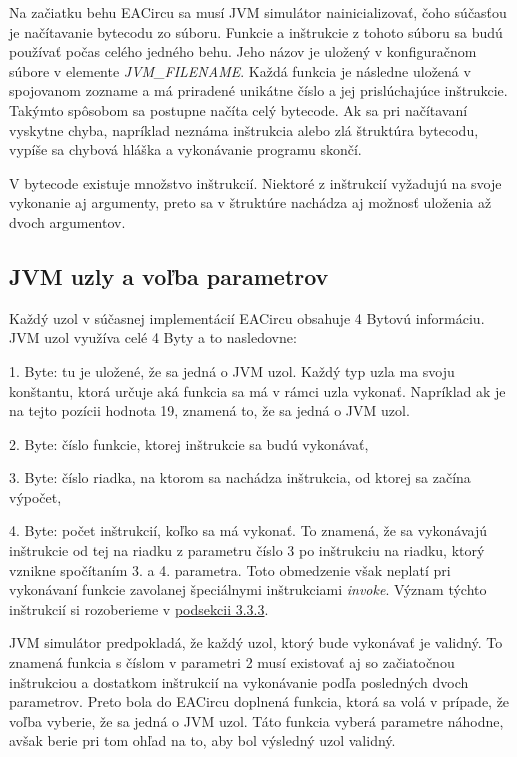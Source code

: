 Na začiatku behu EACircu sa musí JVM simulátor nainicializovať, čoho súčasťou je načítavanie bytecodu zo súboru. Funkcie a inštrukcie z tohoto súboru sa budú používať počas celého jedného behu. Jeho názov je uložený v konfiguračnom súbore v elemente \textit{JVM\_FILENAME}. Každá funkcia je následne uložená v spojovanom zozname a má priradené unikátne číslo a jej prislúchajúce inštrukcie. Takýmto spôsobom sa postupne načíta celý bytecode. Ak sa pri načítavaní vyskytne chyba, napríklad neznáma inštrukcia alebo zlá štruktúra bytecodu, vypíše sa chybová hláška a vykonávanie programu skončí.

V bytecode existuje množstvo inštrukcií. Niektoré z inštrukcií vyžadujú na svoje vykonanie aj argumenty, preto sa v štruktúre nachádza aj možnosť uloženia až dvoch argumentov.

\subsection{JVM uzly a voľba parametrov}
\label{subsec:jvm-nodes}

Každý uzol v súčasnej implementácií EACircu obsahuje 4 Bytovú informáciu. JVM uzol využíva celé 4 Byty a to nasledovne: \vspace{0pt}

\begin{myItemize}
	\item 1. Byte: tu je uložené, že sa jedná o JVM uzol. Každý typ uzla ma svoju konštantu, ktorá určuje aká funkcia sa má v rámci uzla vykonať. Napríklad ak je na tejto pozícii hodnota 19, znamená to, že sa jedná o JVM uzol.
	\item 2. Byte: číslo funkcie, ktorej inštrukcie sa budú vykonávať,
	\item 3. Byte: číslo riadka, na ktorom sa nachádza inštrukcia, od ktorej sa začína výpočet,
	\item 4. Byte: počet inštrukcií, koľko sa má vykonať. To znamená, že sa vykonávajú inštrukcie od tej na riadku z parametru číslo 3 po inštrukciu na riadku, ktorý vznikne spočítaním 3. a 4. parametra. Toto obmedzenie však neplatí pri vykonávaní funkcie zavolanej špeciálnymi inštrukciami \textit{invoke}. Význam týchto inštrukcií si rozoberieme v \hyperref[subsec:emulating-ins]{podsekcii 3.3.3}.
\end{myItemize}
JVM simulátor predpokladá, že každý uzol, ktorý bude vykonávať je validný. To znamená funkcia s číslom v parametri 2 musí existovať aj so začiatočnou inštrukciou a dostatkom inštrukcií na vykonávanie podľa posledných dvoch parametrov. Preto bola do EACircu doplnená funkcia, ktorá sa volá v prípade, že voľba vyberie, že sa jedná o JVM uzol. Táto funkcia vyberá parametre náhodne, avšak berie pri tom ohľad na to, aby bol výsledný uzol validný.

